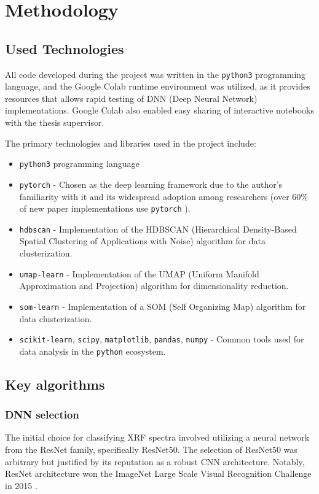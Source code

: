 \section{Methodology}
\subsection{Used Technologies}

All code developed during the project was written in the \texttt{python3} programming language, and the Google Colab runtime environment was utilized, as it provides resources that allows rapid testing of DNN (Deep Neural Network) implementations. 
Google Colab also enabled easy sharing of interactive notebooks with the thesis supervisor.

The primary technologies and libraries used in the project include:
\begin{itemize}
    \item \texttt{python3} programming language
    \item \texttt{pytorch} - Chosen as the deep learning framework due to the author's familiarity with it and its widespread adoption among researchers (over 60\% of new paper implementations use \texttt{pytorch} \cite{papersWithCodeTrends}).
    \item \texttt{hdbscan} - Implementation of the HDBSCAN (Hierarchical Density-Based Spatial Clustering of Applications with Noise) algorithm for data clusterization.
    \item \texttt{umap-learn} - Implementation of the UMAP (Uniform Manifold Approximation and Projection) algorithm for dimensionality reduction.
    \item \texttt{som-learn} - Implementation of a SOM (Self Organizing Map) algorithm for data clusterization.
    \item \texttt{scikit-learn}, \texttt{scipy}, \texttt{matplotlib}, \texttt{pandas}, \texttt{numpy} - Common tools used for data analysis in the \texttt{python} ecosystem.
\end{itemize}

\subsection{Key algorithms}
\subsubsection{DNN selection}

The initial choice for classifying XRF spectra involved utilizing a neural network from the ResNet family, specifically ResNet50. The selection of ResNet50 was arbitrary but justified by its reputation as a robust CNN architecture. Notably, ResNet architecture won the ImageNet Large Scale Visual Recognition Challenge in 2015 \cite{ImageNet2015}.

